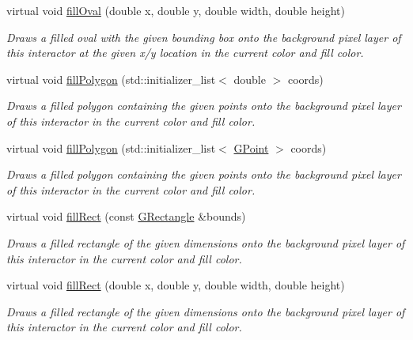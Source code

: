 \begin{DoxyCompactItemize}
virtual void \mbox{\hyperlink{classsgl_1_1GDrawingSurface_a28c700c82f31cd328a4629273420ee61}{fill\+Oval}} (double x, double y, double width, double height)
\begin{DoxyCompactList}\small\item\em Draws a filled oval with the given bounding box onto the background pixel layer of this interactor at the given x/y location in the current color and fill color. \end{DoxyCompactList}\item 
virtual void \mbox{\hyperlink{classsgl_1_1GDrawingSurface_a15f8c1c4409ef51c1a30a92a195b8f66}{fill\+Polygon}} (std\+::initializer\+\_\+list$<$ double $>$ coords)
\begin{DoxyCompactList}\small\item\em Draws a filled polygon containing the given points onto the background pixel layer of this interactor in the current color and fill color. \end{DoxyCompactList}\item 
virtual void \mbox{\hyperlink{classsgl_1_1GDrawingSurface_a31822d59786156ebf1cc3b2f7fb70330}{fill\+Polygon}} (std\+::initializer\+\_\+list$<$ \mbox{\hyperlink{structsgl_1_1GPoint}{G\+Point}} $>$ coords)
\begin{DoxyCompactList}\small\item\em Draws a filled polygon containing the given points onto the background pixel layer of this interactor in the current color and fill color. \end{DoxyCompactList}\item 
virtual void \mbox{\hyperlink{classsgl_1_1GDrawingSurface_ae6582295003bf2488836b1993dadbad7}{fill\+Rect}} (const \mbox{\hyperlink{structsgl_1_1GRectangle}{G\+Rectangle}} \&bounds)
\begin{DoxyCompactList}\small\item\em Draws a filled rectangle of the given dimensions onto the background pixel layer of this interactor in the current color and fill color. \end{DoxyCompactList}\item 
virtual void \mbox{\hyperlink{classsgl_1_1GDrawingSurface_aac3ae7d3aee950de78eca0e108352254}{fill\+Rect}} (double x, double y, double width, double height)
\begin{DoxyCompactList}\small\item\em Draws a filled rectangle of the given dimensions onto the background pixel layer of this interactor in the current color and fill color. \end{DoxyCompactList}\item 

\end{DoxyCompactItemize}
